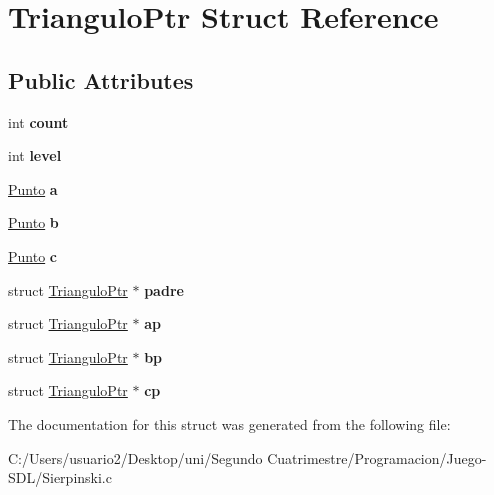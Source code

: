 \hypertarget{struct_triangulo_ptr}{}\section{Triangulo\+Ptr Struct Reference}
\label{struct_triangulo_ptr}
\subsection*{Public Attributes}
\begin{DoxyCompactItemize}
\item 
int {\bfseries count}\hypertarget{struct_triangulo_ptr_a05f5e9b09f4f2e41e658ee22cb58b1d8}{}\label{struct_triangulo_ptr_a05f5e9b09f4f2e41e658ee22cb58b1d8}

\item 
int {\bfseries level}\hypertarget{struct_triangulo_ptr_a7140bba5b188de7952fbe369760d156d}{}\label{struct_triangulo_ptr_a7140bba5b188de7952fbe369760d156d}

\item 
\hyperlink{_sierpinski_8h_ad5ccdfcda50a1b3ef1ab186cfb7169a6}{Punto} {\bfseries a}\hypertarget{struct_triangulo_ptr_a6cc54b656326cdf30c55b25992189dce}{}\label{struct_triangulo_ptr_a6cc54b656326cdf30c55b25992189dce}

\item 
\hyperlink{_sierpinski_8h_ad5ccdfcda50a1b3ef1ab186cfb7169a6}{Punto} {\bfseries b}\hypertarget{struct_triangulo_ptr_a4c2733e9d3f9ea51527e8a79313e5ee5}{}\label{struct_triangulo_ptr_a4c2733e9d3f9ea51527e8a79313e5ee5}

\item 
\hyperlink{_sierpinski_8h_ad5ccdfcda50a1b3ef1ab186cfb7169a6}{Punto} {\bfseries c}\hypertarget{struct_triangulo_ptr_a9710664796753926a19864ac89c0cf02}{}\label{struct_triangulo_ptr_a9710664796753926a19864ac89c0cf02}

\item 
struct \hyperlink{struct_triangulo_ptr}{Triangulo\+Ptr} $\ast$ {\bfseries padre}\hypertarget{struct_triangulo_ptr_ae96f3f51e28c1d58893566afa80118c2}{}\label{struct_triangulo_ptr_ae96f3f51e28c1d58893566afa80118c2}

\item 
struct \hyperlink{struct_triangulo_ptr}{Triangulo\+Ptr} $\ast$ {\bfseries ap}\hypertarget{struct_triangulo_ptr_a71c12ab7fb48ed9af4b581ebc26f274d}{}\label{struct_triangulo_ptr_a71c12ab7fb48ed9af4b581ebc26f274d}

\item 
struct \hyperlink{struct_triangulo_ptr}{Triangulo\+Ptr} $\ast$ {\bfseries bp}\hypertarget{struct_triangulo_ptr_acb9d823f7662ff785cd9b873a76520e7}{}\label{struct_triangulo_ptr_acb9d823f7662ff785cd9b873a76520e7}

\item 
struct \hyperlink{struct_triangulo_ptr}{Triangulo\+Ptr} $\ast$ {\bfseries cp}\hypertarget{struct_triangulo_ptr_a20bc55989bf07a987434f8806c8c7f2a}{}\label{struct_triangulo_ptr_a20bc55989bf07a987434f8806c8c7f2a}

\end{DoxyCompactItemize}


The documentation for this struct was generated from the following file\+:\begin{DoxyCompactItemize}
\item 
C\+:/\+Users/usuario2/\+Desktop/uni/\+Segundo Cuatrimestre/\+Programacion/\+Juego-\/\+S\+D\+L/Sierpinski.\+c\end{DoxyCompactItemize}
